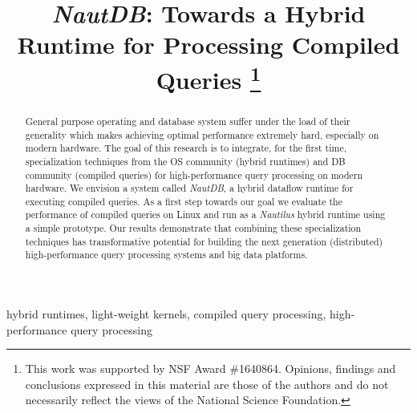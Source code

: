\documentclass[conference]{IEEEtran}
\begin{document}
\title{\emph{NautDB}: Towards a Hybrid Runtime for Processing Compiled Queries
\thanks{This work was supported by NSF Award \#1640864. Opinions, findings and conclusions expressed in this material are those of the authors and do not necessarily reflect the views of the National Science Foundation.}
}

\author{
\and
{}
\and
{}
}

\maketitle

\begin{abstract}
General purpose operating and database system suffer under the load of their generality which makes achieving optimal performance extremely hard, especially on modern hardware.
The goal of this research is to integrate, for the first time, specialization techniques from the OS community (hybrid runtimes) and DB community (compiled queries) for high-performance query processing on modern hardware. We envision a system called \emph{NautDB}, a hybrid dataflow runtime for executing compiled queries. As a first step towards our goal we evaluate the performance of compiled queries on Linux and run as a \emph{Nautilus} hybrid runtime using a simple prototype.
Our results demonstrate that combining these specialization techniques has transformative potential for building the next generation (distributed) high-performance query processing systems and big data platforms.
\end{abstract}

\begin{IEEEkeywords}
hybrid runtimes, light-weight kernels, compiled query processing, high-performance query processing
\end{IEEEkeywords}
\end{document}
